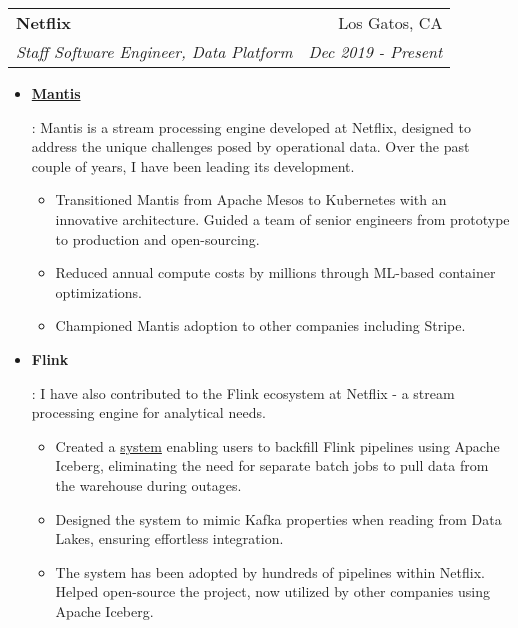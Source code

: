 \documentclass[letterpaper,11pt]{article}
\makeatletter
\newcommand{\resumeItem}[2]{
  \item\small{
    \textbf{#1}{: #2 \vspace{-2pt}}
  }
}
\newcommand{\resumeSubheading}[4]{
  \vspace{-1pt}\item
    \begin{tabular*}{0.97\textwidth}[t]{l@{\extracolsep{\fill}}r}
      \textbf{#1} & #2 \\
      \textit{\small#3} & \textit{\small #4} \\
    \end{tabular*}\vspace{-5pt}
}
\newcommand{\resumeSubSubheading}[2]{
    \begin{tabular*}{0.97\textwidth}{l@{\extracolsep{\fill}}r}
      \textit{\small#1} & \textit{\small #2} \\
    \end{tabular*}\vspace{-5pt}
}
\newcommand{\resumeItemListStart}{\begin{itemize}}
\newcommand{\resumeItemListEnd}{\end{itemize}}
\makeatother
\begin{document}
\resumeSubheading
{Netflix}{Los Gatos, CA}
{Staff Software Engineer, Data Platform}{Dec 2019 - Present}
\resumeItemListStart
\resumeItem{\href{https://netflix.github.io/mantis/}{Mantis}}
{
  Mantis is a stream processing engine developed at Netflix, designed to address the unique challenges posed by operational data.
  Over the past couple of years, I have been leading its development.
  \begin{itemize}[label=\textbf{--}]
    \item
          Transitioned Mantis from Apache Mesos to Kubernetes with an innovative architecture.
          Guided a team of senior engineers from prototype to production and open-sourcing.
    \item
          Reduced annual compute costs by millions through ML-based container optimizations.
    \item
          Championed Mantis adoption to other companies including Stripe.
  \end{itemize}
}
\resumeItem{Flink}
{
  I have also contributed to the Flink ecosystem at Netflix - a stream processing engine for analytical needs.
  \begin{itemize}[label=\textbf{--}]
    \item Created a \href{https://www.youtube.com/watch?v=tB4rx_W9Xqw}{system} enabling users to backfill Flink pipelines using Apache Iceberg, eliminating the need for separate batch jobs to pull data from the warehouse during outages.
    \item Designed the system to mimic Kafka properties when reading from Data Lakes, ensuring effortless integration.
    \item The system has been adopted by hundreds of pipelines within Netflix. Helped open-source the project, now utilized by other companies using Apache Iceberg.
  \end{itemize}
}
\resumeItemListEnd

\end{document}
